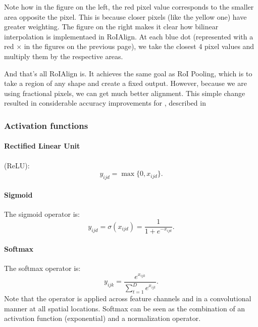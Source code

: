 Note how in the figure on the left, the red pixel value corresponds to the smaller area opposite the pixel. This is because closer pixels (like the yellow one) have greater weighting.
The figure on the right makes it clear how bilinear interpolation is implementaed in RoIAlign. At each blue dot (represented with a red $\times$ in the figures on the previous page), we take the closest 4 pixel values and multiply them by the respective areas.

And that's all RoIAlign is. It achieves the same goal as RoI Pooling, which is to take a region of any shape and create a fixed output. However, because we are using fractional pixels, we can get much better alignment. This simple change resulted in considerable accuracy improvements for \maskrcnn, described in 

\subsubsection{Activation functions}\label{s:activation}

\paragraph{Rectified Linear Unit}\label{s:relu}
(ReLU):
	\[
	y_{ijd} = \max\{0, x_{ijd}\}.
	\]
	

\paragraph{Sigmoid}\label{s:sigmoid}
The sigmoid operator is:
	\[
	y_{ijd} = \sigma(x_{ijd}) = \frac{1}{1+e^{-x_{ijd}}}.
	\]
\paragraph{Softmax}\label{s:softmax}

The softmax operator is:
\[
y_{ijk} = \frac{e^{x_{ijk}}}{\sum_{t=1}^D e^{x_{ijt}}}.
\]
Note that the operator is applied across feature channels and in a convolutional manner at all spatial locations. Softmax can be seen as the combination of an activation function (exponential) and a normalization operator. 

